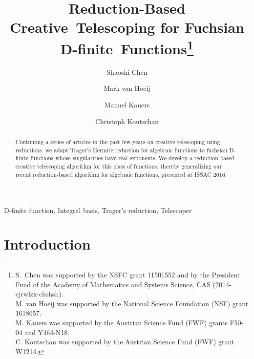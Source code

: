 \documentclass[final,1p,times,authoryear]{elsarticle}
\begin{document}
\begin{frontmatter}

  \title{Reduction-Based Creative~Telescoping for Fuchsian D-finite~Functions\footnote{S.\ Chen was supported by the NSFC grant
11501552 and by the President Fund of the Academy of
Mathematics and Systems Science, CAS (2014-cjrwlzx-chshsh).\\
M. van Hoeij was supported by the National Science Foundation (NSF) grant 1618657.\\
M. Kauers was supported by the Austrian Science Fund (FWF) grants F50-04 and Y464-N18.\\
C. Koutschan was supported by the Austrian Science Fund (FWF) grant W1214.
}}

  \author{Shaoshi Chen}
  \address{KLMM,\, AMSS, \,Chinese Academy of Sciences, Beijing, 100190, (China)}

  \author{Mark van Hoeij}
  \address{Department of Mathematics,  Florida State University, FL 32306-4510, (USA)}

  \author{Manuel Kauers}
  \address{Institute for Algebra, Johannes Kepler University, Altenberger Stra\ss e 69, A-4040 Linz, (Austria)}

  \author{Christoph Koutschan}
  \address{RICAM, Austrian Academy of Sciences, Altenberger Stra\ss e 69, A-4040 Linz, (Austria)}

\begin{abstract}
  Continuing a series of articles in the past few years on creative telescoping using reductions,
  we adapt Trager's Hermite reduction for algebraic functions to fuchsian D-finite functions
  whose singularities have real exponents. We
  develop a reduction-based creative telescoping algorithm for this class of functions, thereby
  generalizing our recent reduction-based algorithm for algebraic functions, presented at ISSAC 2016.
\end{abstract}

\begin{keyword}
  D-finite function,
  Integral basis,
  Trager's reduction,
  Telescoper
\end{keyword}
\end{frontmatter}

\section{Introduction}\label{SECT:intro}
\end{document}
